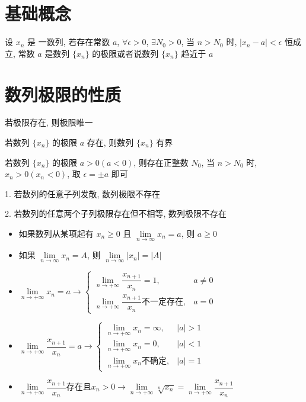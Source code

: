 \section{基础概念}
\begin{definition}[数列极限]
	设 $x_{n}$ 是 一数列, 若存在常数 $a$, $\forall \epsilon>0$, $\exists N_{0}>0$, 当 $n>N_{0}$ 时, $|x_{n}-a|<\epsilon$ 恒成立, 常数 $a$ 是数列 $\{x_{n}\}$ 的极限或者说数列 $\{x_{n}\}$ 趋近于 $a$
\end{definition}

\section{数列极限的性质}
\begin{property}[唯一性]
	若极限存在, 则极限唯一
\end{property}

\begin{property}[有界性]
	若数列 $\{x_{n}\}$ 的极限 $a$ 存在, 则数列 $\{x_{n}\}$ 有界
\end{property}

\begin{property}[保号性]
	若数列 $\{x_{n}\}$ 的极限 $a>0(a<0)$, 则存在正整数 $N_{0}$, 当 $n>N_{0}$ 时, $x_{n}>0(x_{n}<0)$, 取 $\epsilon = \pm a$ 即可
\end{property}
\begin{anymark}[注]
	1. 若数列的任意子列发散, 数列极限不存在

	2. 若数列的任意两个子列极限存在但不相等, 数列极限不存在
\end{anymark}
\begin{corollary}[数列极限]
	\begin{itemize}
		\item 如果数列从某项起有 $x_{n}\geq 0$ 且 $\lim\limits_{n\to\infty}x_{n} = a$, 则 $a\geq 0$
		\item 如果 $\lim\limits_{n\to\infty} x_{n} = A$, 则 $\lim\limits_{n\to\infty} |x_{n}| = |A|$
		\item $\lim\limits_{n\rightarrow +\infty}x_{n}=a\to \begin{cases} \lim\limits_{n\rightarrow +\infty}\dfrac{x_{n+1}}{x_{n}}=1, & a\neq 0\\ \lim\limits_{n\rightarrow +\infty}\dfrac{x_{n+1}}{x_{n}} \text{不一定存在}, & a=0  \end{cases}$
		\item $\lim\limits_{n\rightarrow +\infty}\dfrac{x_{n+1}}{x_{n}}=a\to \begin{cases} \lim\limits_{n\rightarrow +\infty}x_{n}=\infty,& |a|>1  \\ \lim\limits_{n\rightarrow +\infty}x_{n}=0,&|a|<1\\  \lim\limits_{n\rightarrow +\infty}x_{n}\text{不确定},&|a|=1 \end{cases}$
		\item $\lim\limits_{n\rightarrow +\infty}\dfrac{x_{n+1}}{x_{n}}\text{存在且}x_{n}>0\to \lim\limits_{n\rightarrow +\infty}\sqrt[n]{x_{n}}=\lim\limits_{n\rightarrow +\infty}\dfrac{x_{n+1}}{x_{n}}$
	\end{itemize}
\end{corollary}

